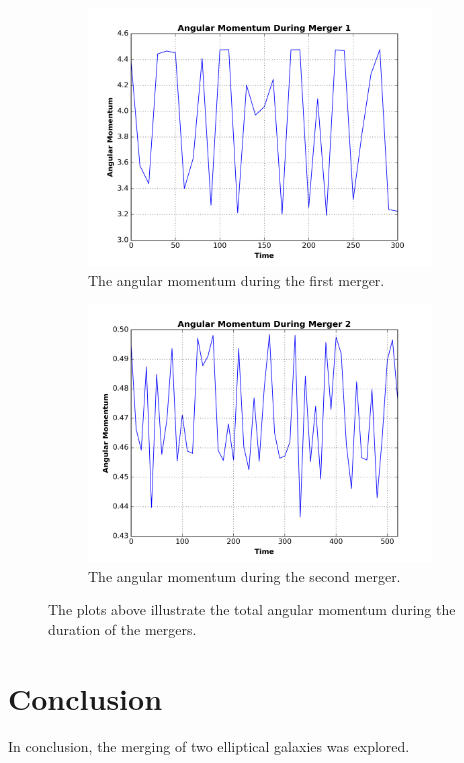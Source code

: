 \documentclass[12pt]{report}
\begin{document}
\begin{figure}[H]
\centering 
    \begin{subfigure}[b]{.475\textwidth}
        \centering
        \includegraphics[width=\linewidth]{angular_momentum_merg13.png}
        \caption[]%
        {{The angular momentum during the first merger.}}
    
        \label{fig:ang_merger1}
    \end{subfigure} %
    \hfill
    \begin{subfigure}[b]{.475\textwidth}
        \centering
        \includegraphics[width=\linewidth]{angular_momentum_merg21.png}
        \caption[]%
        {{The angular momentum during the second merger.}}
        \label{fig:ang_merger2} 
    \end{subfigure} %
    \caption[]
        {The plots above illustrate the total angular momentum during the duration of the mergers.} 
        \label{fig:angular_mmentum}
\end{figure}

\section*{Conclusion}

In conclusion, the merging of two elliptical galaxies was explored.




\end{document}
